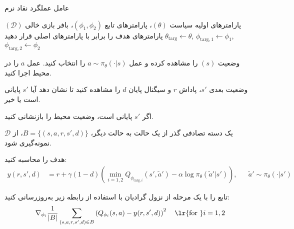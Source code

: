   \begin{algorithm}[H]
	\caption{عامل عملگرد نقاد نرم}\label{alg:SAC}
	\begin{algorithmic}[1]
		 پارامترهای اولیه سیاست
		$(\theta)$، پارامترهای تابع
		$(\phi_1, \phi_2)$،
		بافر بازی خالی $(\mathcal{D})$
		\State پارامترهای هدف را برابر با پارامترهای اصلی قرار دهید
		$\theta_{\text{targ}} \leftarrow \theta$,
		$\phi_{\text{targ}, 1} \leftarrow \phi_1$,
		$\phi_{\text{targ}, 2} \leftarrow \phi_2$
		
		\State 
		وضعیت $(s)$ را مشاهده کرده و عمل 
		$a \sim \pi_{\theta}(\cdot|s)$
		را انتخاب کنید.
		\State عمل $a$ را در محیط اجرا کنید.
		  \State \parbox[t]{\dimexpr\linewidth-\algorithmicindent}{
					وضعیت بعدی $s'$، پاداش $r$ و سیگنال پایان $d$ را مشاهده کنید تا نشان دهد آیا $s'$ پایانی است یا خیر.
			\strut}

		\State اگر $s'$ پایانی است، وضعیت محیط را بازنشانی کنید.
			
		\State یک دسته تصادفی گذر از ‌یک حالت به حالت دیگر، $B = \{ (s,a,r,s',d) \}$، از $\mathcal{D}$ نمونه‌گیری شود.
		
		\State
		هدف را محاسبه کنید:
		\begin{align*}
			y (r,s',d) &= r + \gamma (1-d) \left(\min_{i=1,2} Q_{\phi_{\text{targ}, i}} (s', \tilde{a}') - \alpha \log \pi_{\theta}(\tilde{a}'|s')\right), && \tilde{a}' \sim \pi_{\theta}(\cdot|s')
		\end{align*}
		
		\State تابع  را با یک مرحله از نزول گرادیان با استفاده از رابطه زیر به‌روزرسانی کنید:
		\begin{align*} 
			\nabla_{\phi_i} \frac{1}{|B|}\sum_{(s,a,r,s',d) \in B} \left( Q_{\phi_i}(s,a) - y(r,s',d) \right)^2 
			\quad \text{\lr{for }}i=1,2 
		\end{align*}
		

\end{algorithmic}
\end{algorithm}
